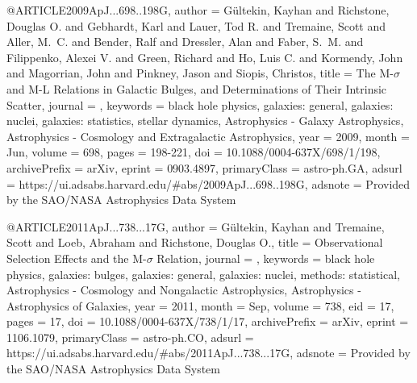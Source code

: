 \documentclass[longauth]{aa}
\begin{document}
@ARTICLE{2009ApJ...698..198G,
       author = {{G{\"u}ltekin}, Kayhan and {Richstone}, Douglas O. and {Gebhardt}, Karl and {Lauer}, Tod R. and {Tremaine}, Scott and {Aller}, M.~C. and {Bender}, Ralf and {Dressler}, Alan and {Faber}, S.~M. and {Filippenko}, Alexei V. and {Green}, Richard and {Ho}, Luis C. and {Kormendy}, John and {Magorrian}, John and {Pinkney}, Jason and {Siopis}, Christos},
        title = {The M-{\ensuremath{\sigma}} and M-L Relations in Galactic Bulges, and Determinations of Their Intrinsic Scatter},
      journal = {\apj},
     keywords = {black hole physics, galaxies: general, galaxies: nuclei, galaxies:
        statistics, stellar dynamics, Astrophysics - Galaxy
        Astrophysics, Astrophysics - Cosmology and Extragalactic
        Astrophysics},
         year = 2009,
        month = Jun,
       volume = {698},
        pages = {198-221},
          doi = {10.1088/0004-637X/698/1/198},
archivePrefix = {arXiv},
       eprint = {0903.4897},
 primaryClass = {astro-ph.GA},
       adsurl = {https://ui.adsabs.harvard.edu/#abs/2009ApJ...698..198G},
      adsnote = {Provided by the SAO/NASA Astrophysics Data System}
}

@ARTICLE{2011ApJ...738...17G,
       author = {{G{\"u}ltekin}, Kayhan and {Tremaine}, Scott and {Loeb}, Abraham and
        {Richstone}, Douglas O.},
        title = {Observational Selection Effects and the M-{\ensuremath{\sigma}} Relation},
      journal = {\apj},
     keywords = {black hole physics, galaxies: bulges, galaxies: general, galaxies:
        nuclei, methods: statistical, Astrophysics - Cosmology and
        Nongalactic Astrophysics, Astrophysics - Astrophysics of
        Galaxies},
         year = 2011,
        month = Sep,
       volume = {738},
          eid = {17},
        pages = {17},
          doi = {10.1088/0004-637X/738/1/17},
archivePrefix = {arXiv},
       eprint = {1106.1079},
 primaryClass = {astro-ph.CO},
       adsurl = {https://ui.adsabs.harvard.edu/#abs/2011ApJ...738...17G},
      adsnote = {Provided by the SAO/NASA Astrophysics Data System}
}
\end{document}
